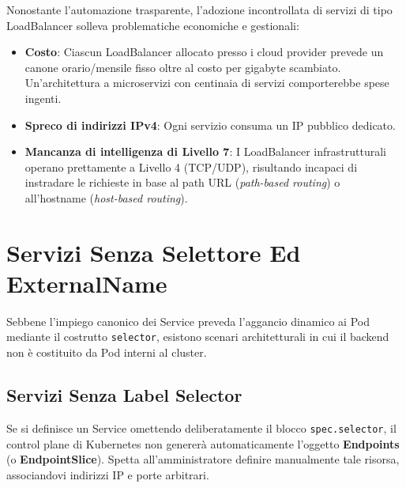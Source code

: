 \documentclass[11pt, a4paper]{article}
\begin{document}
Nonostante l'automazione trasparente, l'adozione incontrollata di servizi di tipo LoadBalancer solleva problematiche economiche e gestionali:
\begin{itemize}[noitemsep]
    \item \textbf{Costo}: Ciascun LoadBalancer allocato presso i cloud provider prevede un canone orario/mensile fisso oltre al costo per gigabyte scambiato. Un'architettura a microservizi con centinaia di servizi comporterebbe spese ingenti.
    \item \textbf{Spreco di indirizzi IPv4}: Ogni servizio consuma un IP pubblico dedicato.
    \item \textbf{Mancanza di intelligenza di Livello 7}: I LoadBalancer infrastrutturali operano prettamente a Livello 4 (TCP/UDP), risultando incapaci di instradare le richieste in base al path URL (\emph{path-based routing}) o all'hostname (\emph{host-based routing}).
\end{itemize}

\newpage


\section{Servizi Senza Selettore Ed ExternalName}

Sebbene l'impiego canonico dei Service preveda l'aggancio dinamico ai Pod mediante il costrutto \texttt{selector}, esistono scenari architetturali in cui il backend non è costituito da Pod interni al cluster.

\subsection{Servizi Senza Label Selector}
Se si definisce un Service omettendo deliberatamente il blocco \texttt{spec.selector}, il control plane di Kubernetes non genererà automaticamente l'oggetto \textbf{Endpoints} (o \textbf{EndpointSlice}). Spetta all'amministratore definire manualmente tale risorsa, associandovi indirizzi IP e porte arbitrari.

\end{document}

